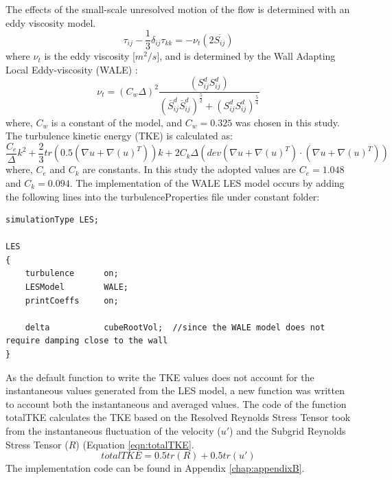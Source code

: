 \documentclass[../main.tex]{subfiles}
\begin{document}
The effects of the small-scale unresolved motion of the flow is determined with an eddy viscosity model.
\begin{equation}
\tau_{ij}-\frac{1}{3} \delta_{ij} \tau_{kk}=-\nu_t\left ( 2\overline{S_{ij}}\right )
\end{equation}
where $\nu_t$ is the eddy viscosity [$m^2/s$], and is determined by the Wall Adapting Local Eddy-viscosity (WALE) \cite{nicoud1999}:
\begin{equation}
\nu_t=(C_w\Delta)^2\frac{\left ( S_{ij}^{d} S_{ij}^{d}\right )}{\left ( \bar{S}_{ij}^{d} \bar{S}_{ij}^{d} \right )^\frac{5}{2}+\left (S_{ij}^{d} S_{ij}^{d}  \right )^\frac{5}{4}}
\label{eqn:nutWALE}
\end{equation}
where, $C_w$ is a constant of the model, and $C_w =0.325$ was chosen in this study. The turbulence kinetic energy (TKE) is calculated as:
\begin{equation}
\frac{C_e}{\Delta}k^2+\frac{2}{3}tr\left ( 0.5\left ( \nabla u+\nabla (u)^T \right ) \right )k+2C_k\Delta\left ( dev \left ( \nabla u+\nabla (u)^T \right )\cdot \left ( \nabla u+\nabla (u)^T \right ) \right )
\label{eqn:tkeWALE}
\end{equation}
where, $C_e$ and $C_k$ are constants. In this study the adopted values are $C_e=1.048$ and $C_k=0.094$.
The implementation of the WALE LES model occurs by adding the following lines into the turbulenceProperties file under constant folder:
\begin{lstlisting}
simulationType LES;

LES
{
	turbulence      on;
	LESModel		WALE;
	printCoeffs		on;
	
	delta           cubeRootVol;  //since the WALE model does not require damping close to the wall
}
\end{lstlisting}
As the default function to write the TKE values does not account for the instantaneous values generated from the LES model, a new function was written to account both the instantaneous and averaged values. The code of the function totalTKE calculates the TKE based on the Resolved Reynolds Stress Tensor took from the instantaneous fluctuation of the velocity ($u'$) and the Subgrid Reynolds Stress Tensor ($R$) (Equation \ref{eqn:totalTKE}.
\begin{equation}
totalTKE= 0.5tr(R) + 0.5tr(u')
\label{eqn:totalTKE}
\end{equation}
The implementation code can be found in Appendix \ref{chap:appendixB}.
\end{document}
